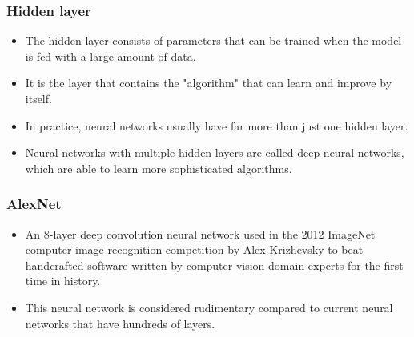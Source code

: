 \documentclass[11pt]{article}
\begin{document}
\subsubsection{Hidden layer}
\label{sec:orge682b33}
\begin{itemize}
\item The hidden layer consists of parameters that can be trained when the model is fed with a large amount of data.
\item It is the layer that contains the "algorithm" that can learn and improve by itself.
\item In practice, neural networks usually have far more than just one hidden layer.
\item Neural networks with multiple hidden layers are called deep neural networks, which are able to learn more sophisticated algorithms.
\end{itemize}
\subsubsection{AlexNet}
\label{sec:org6000b01}
\begin{itemize}
\item An 8-layer deep convolution neural network used in the 2012 ImageNet computer image recognition competition by Alex Krizhevsky to beat handcrafted software written by computer vision domain experts for the first time in history.
\item This neural network is considered rudimentary compared to current neural networks that have hundreds of layers.
\end{itemize}
\end{document}
